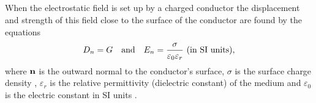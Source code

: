 \subsection{}\label{16.4.4} When the electrostatic field is set up by a charged conductor the displacement and strength of this field close to the surface of the conductor are found by the equations
\begin{equation*}%
D_{n} = G \qand E_{n}= \frac{\sigma}{\varepsilon_{0}\varepsilon_{r}} \,\, \text{(in SI units)},
\end{equation*}
where $\vb{n}$ is the outward normal to the conductor's surface, $\sigma$ is the surface charge density , $\varepsilon_{r}$ is the relative permittivity (dielectric constant) of the medium  and $\varepsilon_{0}$ is the electric constant in SI units .
